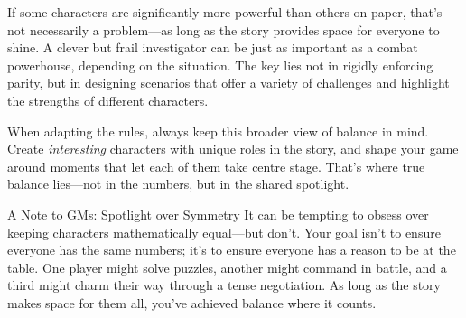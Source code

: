If some characters are significantly more powerful than others on paper, that’s not necessarily a problem—as long as the story provides space for everyone to shine. A clever but frail investigator can be just as important as a combat powerhouse, depending on the situation. The key lies not in rigidly enforcing parity, but in designing scenarios that offer a variety of challenges and highlight the strengths of different characters.

When adapting the rules, always keep this broader view of balance in mind. Create \emph{interesting} characters with unique roles in the story, and shape your game around moments that let each of them take centre stage. That’s where true balance lies—not in the numbers, but in the shared spotlight.

\begin{WyrdComment}{A Note to GMs: Spotlight over Symmetry}
    It can be tempting to obsess over keeping characters mathematically equal—but don't. Your goal isn’t to ensure everyone has the same numbers; it’s to ensure everyone has a reason to be at the table. One player might solve puzzles, another might command in battle, and a third might charm their way through a tense negotiation. As long as the story makes space for them all, you've achieved balance where it counts.
\end{WyrdComment}
